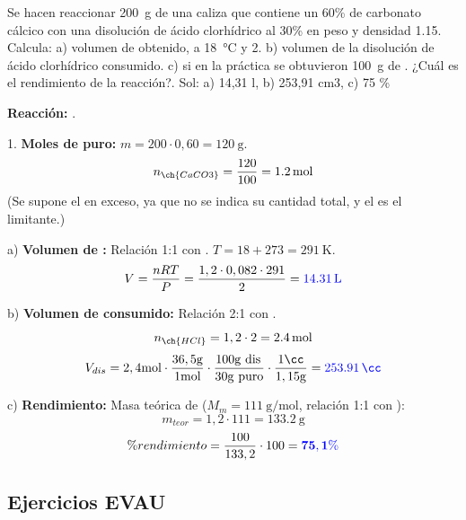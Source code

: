 \begin{exercise}
    Se hacen reaccionar \qty{200}{\g} de una caliza que contiene un 60\% de carbonato cálcico con una disolución de ácido clorhídrico al 30\% en peso y densidad \qty{1.15}{\gpcc}. Calcula: a) volumen de  obtenido, a \qty{18}{\celsius} y \qty{2}{\atm}. b) volumen de la disolución de ácido clorhídrico consumido. c) si en la práctica se obtuvieron \qty{100}{\g} de . ¿Cuál es el rendimiento de la reacción?. Sol: a) 14,31 l, b) 253,91 cm3, c) 75 \%
    \begin{solu}
        \textbf{Reacción:} .

        1. \textbf{Moles de  puro:} $m = 200 \cdot 0,60 = \qty{120}{\g}$.
        \[ n_{\ch{CaCO3}} = \dfrac{120}{100} = \qty{1,2}{\mol} \]
        (Se supone el  en exceso, ya que no se indica su cantidad total, y el  es el limitante.)

        a) \textbf{Volumen de :} Relación 1:1 con . $T = 18+273 = \qty{291}{\K}$.
        \[ V = \dfrac{nRT}{P} = \dfrac{1,2 \cdot 0,082 \cdot 291}{2} = \mathbf{\textcolor{blue}{\qty{14,31}{\L}}} \]

        b) \textbf{Volumen de  consumido:} Relación 2:1 con .
        \[ n_{\ch{HCl}} = 1,2 \cdot 2 = \qty{2,4}{\mol} \]
        \[ V_{dis} = 2,4 \si{\mol} \cdot \dfrac{36,5 \si{\g}}{1 \si{\mol}} \cdot \dfrac{100 \si{\g\ dis.}}{30 \si{\g\ puro}} \cdot \dfrac{1 \si{\cc}}{1,15 \si{\g}} = \mathbf{\textcolor{blue}{\qty{253,91}{\cc}}} \]

        c) \textbf{Rendimiento:} Masa teórica de  ($M_m = \qty{111}{\g\per\mol}$, relación 1:1 con ):
        \[ m_{teor} = 1,2 \cdot 111 = \qty{133,2}{\g} \]
        \[ \% rendimiento = \dfrac{100}{133,2} \cdot 100 = \mathbf{\textcolor{blue}{75,1 \%}} \]
    \end{solu}
\end{exercise}

\subsection{Ejercicios EVAU}

